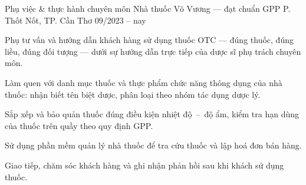 \begin{cventries}

  \cventry
    {Phụ việc \& thực hành chuyên môn}
    {Nhà thuốc Võ Vương --- đạt chuẩn GPP}
    {P. Thốt Nốt, TP. Cần Thơ}
    {09/2023 -- nay}
    {
      \begin{cvitems}
        \item {Phụ tư vấn và hướng dẫn khách hàng sử dụng thuốc OTC --- đúng thuốc,
               đúng liều, đúng đối tượng --- dưới sự hướng dẫn trực tiếp của dược sĩ
               phụ trách chuyên môn.}
        \item {Làm quen với danh mục thuốc và thực phẩm chức năng thông dụng của nhà
               thuốc: nhận biết tên biệt dược, phân loại theo nhóm tác dụng dược lý.}
        \item {Sắp xếp và bảo quản thuốc đúng điều kiện nhiệt độ~--~độ ẩm, kiểm tra hạn
               dùng của thuốc trên quầy theo quy định GPP.}
        \item {Sử dụng phần mềm quản lý nhà thuốc để tra cứu thuốc và lập hoá đơn bán
               hàng.}
        \item {Giao tiếp, chăm sóc khách hàng và ghi nhận phản hồi sau khi khách sử
               dụng thuốc.}
      \end{cvitems}
    }

\end{cventries}
